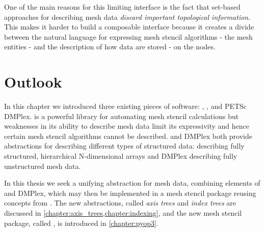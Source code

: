 \documentclass[thesis]{subfiles}
\begin{document}
One of the main reasons for this limiting interface is the fact that set-based approaches for describing mesh data \emph{discard important topological information}.
This makes it harder to build a composable interface because it creates a divide between the natural language for expressing mesh stencil algorithms - the mesh entities - and the description of how data are stored - on the nodes.

\section{Outlook}

In this chapter we introduced three existing pieces of software: , \numpy{}, and PETSc DMPlex.
 is a powerful library for automating mesh stencil calculations but weaknesses in its ability to describe mesh data limit its expressivity and hence certain mesh stencil algorithms cannot be described.
\numpy{} and DMPlex both provide abstractions for describing different types of structured data: \numpy{} describing fully structured, hierarchical N-dimensional arrays and DMPlex describing fully unstructured mesh data.

In this thesis we seek a unifying abstraction for mesh data, combining elements of \numpy{} and DMPlex, which may then be implemented in a mesh stencil package reusing concepts from .
The new abstractions, called \emph{axis trees} and \emph{index trees} are discussed in \cref{chapter:axis_trees,chapter:indexing}, and the new mesh stencil package, called , is introduced in \cref{chapter:pyop3}.
\end{document}
